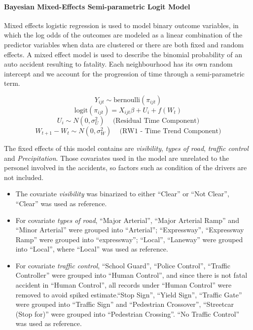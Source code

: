 \documentclass[]{article}
\providecommand{\tightlist}{%
  \setlength{\itemsep}{0pt}\setlength{\parskip}{0pt}}
\let\oldparagraph\paragraph
\renewcommand{\paragraph}[1]{\oldparagraph{#1}\mbox{}}
\begin{document}
\paragraph{Bayesian Mixed-Effects Semi-parametric Logit
Model}\label{bayesian-mixed-effects-semi-parametric-logit-model}

Mixed effects logistic regression is used to model binary outcome
variables, in which the log odds of the outcomes are modeled as a linear
combination of the predictor variables when data are clustered or there
are both fixed and random effects. A mixed effect model is used to
describe the binomial probability of an auto accident resulting to
fatality. Each neighbourhood has its own random intercept and we account
for the progression of time through a semi-parametric term.

\begin{equation}
Y_{ijt} \sim \text{bernoulli}(\pi_{ijt})
\end{equation}\begin{equation}
\text{logit}(\pi_{ijt}) = X_{ijt}\beta + U_i + f(W_{t})
\end{equation}\begin{equation}
U_i \sim N(0, \sigma^2_U)\;\;\;\text{ (Residual Time Component)}
\end{equation}\begin{equation}
W_{t+1} - W_{t} \sim N(0, \sigma^2_W)\;\;\;\text{ (RW1 - Time Trend Component)}
\end{equation}

The fixed effects of this model contains are \emph{visibility},
\emph{types of road}, \emph{traffic control} and \emph{Precipitation}.
Those covariates used in the model are unrelated to the personel
involved in the accidents, so factors such as condition of the drivers
are not included.

\begin{itemize}
\tightlist
\item
  The covariate \emph{visibility} was binarized to either ``Clear'' or
  ``Not Clear'', ``Clear'' was used as reference.
\item
  For covariate \emph{types of road}, ``Major Arterial'', ``Major
  Arterial Ramp'' and ``Minor Arterial'' were grouped into ``Arterial'';
  ``Expressway'', ``Expressway Ramp'' were grouped into ``expressway'';
  ``Local'', ``Laneway'' were grouped into ``Local'', where ``Local''
  was used as reference.
\item
  For covariate \emph{traffic control}, ``School Guard'', ``Police
  Control'', ``Traffic Controller'' were grouped into ``Human Control'',
  and since there is not fatal accident in ``Human Control'', all
  records under ``Human Control'' were removed to avoid spiked
  estimate.``Stop Sign'', ``Yield Sign'', ``Traffic Gate'' were grouped
  into ``Traffic Sign'' and ``Pedestrian Crossover'', ``Streetcar (Stop
  for)'' were grouped into ``Pedestrian Crossing''. ``No Traffic
  Control'' was used as reference.
\end{itemize}
\end{document}
